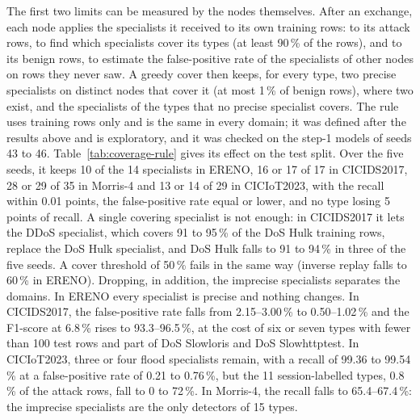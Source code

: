 The first two limits can be measured by the nodes themselves. After an exchange, each node applies the specialists it received to its own training rows: to its attack rows, to find which specialists cover its types (at least 90\,\% of the rows), and to its benign rows, to estimate the false-positive rate of the specialists of other nodes on rows they never saw. A greedy cover then keeps, for every type, two precise specialists on distinct nodes that cover it (at most 1\,\% of benign rows), where two exist, and the specialists of the types that no precise specialist covers. The rule uses training rows only and is the same in every domain; it was defined after the results above and is exploratory, and it was checked on the step-1 models of seeds 43 to 46. Table~\ref{tab:coverage-rule} gives its effect on the test split. Over the five seeds, it keeps 10 of the 14 specialists in ERENO, 16 or 17 of 17 in CICIDS2017, 28 or 29 of 35 in Morris-4 and 13 or 14 of 29 in CICIoT2023, with the recall within 0.01 points, the false-positive rate equal or lower, and no type losing 5 points of recall. A single covering specialist is not enough: in CICIDS2017 it lets the DDoS specialist, which covers 91 to 95\,\% of the DoS Hulk training rows, replace the DoS Hulk specialist, and DoS Hulk falls to 91 to 94\,\% in three of the five seeds. A cover threshold of 50\,\% fails in the same way (inverse replay falls to 60\,\% in ERENO). Dropping, in addition, the imprecise specialists separates the domains. In ERENO every specialist is precise and nothing changes. In CICIDS2017, the false-positive rate falls from 2.15--3.00\,\% to 0.50--1.02\,\% and the F1-score at 6.8\,\% rises to 93.3--96.5\,\%, at the cost of six or seven types with fewer than 100 test rows and part of DoS Slowloris and DoS Slowhttptest. In CICIoT2023, three or four flood specialists remain, with a recall of 99.36 to 99.54\,\% at a false-positive rate of 0.21 to 0.76\,\%, but the 11 session-labelled types, 0.8\,\% of the attack rows, fall to 0 to 72\,\%. In Morris-4, the recall falls to 65.4--67.4\,\%: the imprecise specialists are the only detectors of 15 types.

